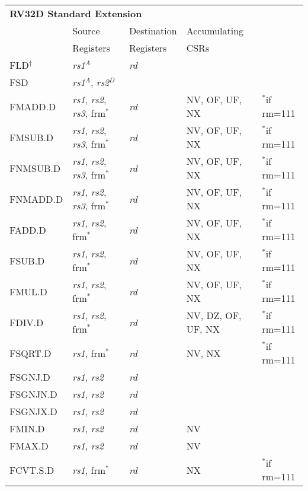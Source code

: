\begin{tabular}{p{3cm}|p{3cm}|p{2cm}|p{4cm}|p{4cm}}
  \multicolumn{4}{l}{\bf RV32D Standard Extension} \\
  \cline{2-4}
   & Source    & Destination & Accumulating \\
   & Registers & Registers   & CSRs \\
  \cline{2-4}
   FLD$^\dagger$ & {\em rs1}$^A$ & {\em rd} &   & \\
   \cline{2-4}
   FSD & {\em rs1}$^A$, {\em rs2}$^D$ &  &   & \\
   \cline{2-4}
   FMADD.D & {\em rs1}, {\em rs2},  {\em rs3}, frm$^*$ & {\em rd} & NV, OF, UF, NX & $^*$if rm=111  \\
   \cline{2-4}
   FMSUB.D & {\em rs1}, {\em rs2},  {\em rs3}, frm$^*$ & {\em rd} & NV, OF, UF, NX & $^*$if rm=111  \\
   \cline{2-4}
   FNMSUB.D & {\em rs1}, {\em rs2},  {\em rs3}, frm$^*$ & {\em rd} & NV, OF, UF, NX & $^*$if rm=111  \\
   \cline{2-4}
   FNMADD.D & {\em rs1}, {\em rs2},  {\em rs3}, frm$^*$ & {\em rd} & NV, OF, UF, NX & $^*$if rm=111  \\
   \cline{2-4}
   FADD.D & {\em rs1}, {\em rs2}, frm$^*$ & {\em rd} & NV, OF, UF, NX & $^*$if rm=111  \\
   \cline{2-4}
   FSUB.D & {\em rs1}, {\em rs2}, frm$^*$ & {\em rd} & NV, OF, UF, NX & $^*$if rm=111  \\
   \cline{2-4}
   FMUL.D & {\em rs1}, {\em rs2}, frm$^*$ & {\em rd} & NV, OF, UF, NX & $^*$if rm=111  \\
   \cline{2-4}
   FDIV.D & {\em rs1}, {\em rs2}, frm$^*$ & {\em rd} & NV, DZ, OF, UF, NX & $^*$if rm=111  \\
   \cline{2-4}
   FSQRT.D & {\em rs1}, frm$^*$ & {\em rd} & NV, NX & $^*$if rm=111  \\
   \cline{2-4}
   FSGNJ.D & {\em rs1}, {\em rs2} & {\em rd} &   & \\
   \cline{2-4}
   FSGNJN.D & {\em rs1}, {\em rs2} & {\em rd} &   & \\
   \cline{2-4}
   FSGNJX.D & {\em rs1}, {\em rs2} & {\em rd} &   & \\
   \cline{2-4}
   FMIN.D & {\em rs1}, {\em rs2} & {\em rd} & NV &   \\
   \cline{2-4}
   FMAX.D & {\em rs1}, {\em rs2} & {\em rd} & NV &   \\
   \cline{2-4}
   FCVT.S.D & {\em rs1}, frm$^*$ & {\em rd} & NX & $^*$if rm=111  \\
   \cline{2-4}

\end{tabular}
